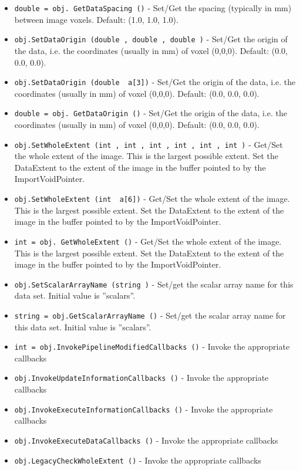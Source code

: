 \begin{itemize}
\item  \verb|double = obj. GetDataSpacing ()| -  Set/Get the spacing (typically in mm) between image voxels.
 Default: (1.0, 1.0, 1.0).

\item  \verb|obj.SetDataOrigin (double , double , double )| -  Set/Get the origin of the data, i.e. the coordinates (usually in mm)
 of voxel (0,0,0).  Default: (0.0, 0.0, 0.0). 

\item  \verb|obj.SetDataOrigin (double  a[3])| -  Set/Get the origin of the data, i.e. the coordinates (usually in mm)
 of voxel (0,0,0).  Default: (0.0, 0.0, 0.0). 

\item  \verb|double = obj. GetDataOrigin ()| -  Set/Get the origin of the data, i.e. the coordinates (usually in mm)
 of voxel (0,0,0).  Default: (0.0, 0.0, 0.0). 

\item  \verb|obj.SetWholeExtent (int , int , int , int , int , int )| -  Get/Set the whole extent of the image.  This is the largest possible
 extent.  Set the DataExtent to the extent of the image in the buffer
 pointed to by the ImportVoidPointer.

\item  \verb|obj.SetWholeExtent (int  a[6])| -  Get/Set the whole extent of the image.  This is the largest possible
 extent.  Set the DataExtent to the extent of the image in the buffer
 pointed to by the ImportVoidPointer.

\item  \verb|int = obj. GetWholeExtent ()| -  Get/Set the whole extent of the image.  This is the largest possible
 extent.  Set the DataExtent to the extent of the image in the buffer
 pointed to by the ImportVoidPointer.

\item  \verb|obj.SetScalarArrayName (string )| -  Set/get the scalar array name for this data set. Initial value is
 ''scalars''.

\item  \verb|string = obj.GetScalarArrayName ()| -  Set/get the scalar array name for this data set. Initial value is
 ''scalars''.

\item  \verb|int = obj.InvokePipelineModifiedCallbacks ()| -  Invoke the appropriate callbacks

\item  \verb|obj.InvokeUpdateInformationCallbacks ()| -  Invoke the appropriate callbacks

\item  \verb|obj.InvokeExecuteInformationCallbacks ()| -  Invoke the appropriate callbacks

\item  \verb|obj.InvokeExecuteDataCallbacks ()| -  Invoke the appropriate callbacks

\item  \verb|obj.LegacyCheckWholeExtent ()| -  Invoke the appropriate callbacks

\end{itemize}
